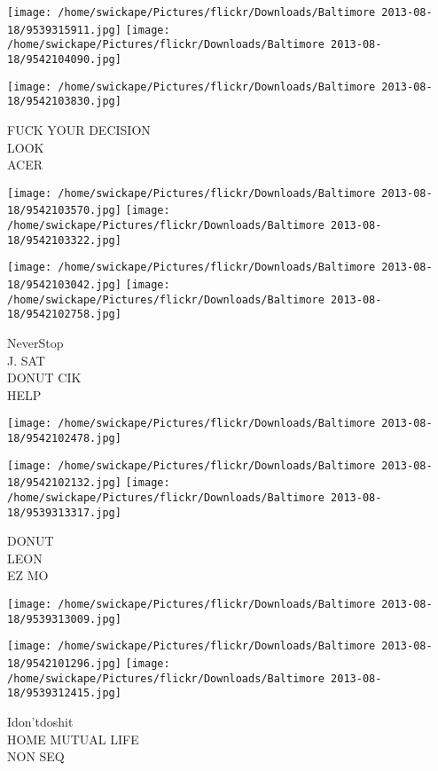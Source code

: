\documentclass[10pt,letterpaper]{article}
\begin{document}
\texttt{[image: /home/swickape/Pictures/flickr/Downloads/Baltimore 2013-08-18/9539315911.jpg]}
\texttt{[image: /home/swickape/Pictures/flickr/Downloads/Baltimore 2013-08-18/9542104090.jpg]}

\vspace{0.25in}
\texttt{[image: /home/swickape/Pictures/flickr/Downloads/Baltimore 2013-08-18/9542103830.jpg]}

FUCK YOUR DECISION\\
LOOK\\
ACER
\pagebreak

\texttt{[image: /home/swickape/Pictures/flickr/Downloads/Baltimore 2013-08-18/9542103570.jpg]}
\texttt{[image: /home/swickape/Pictures/flickr/Downloads/Baltimore 2013-08-18/9542103322.jpg]}

\texttt{[image: /home/swickape/Pictures/flickr/Downloads/Baltimore 2013-08-18/9542103042.jpg]}
\texttt{[image: /home/swickape/Pictures/flickr/Downloads/Baltimore 2013-08-18/9542102758.jpg]}

NeverStop\\
J. SAT\\
DONUT CIK\\
HELP
\pagebreak

\texttt{[image: /home/swickape/Pictures/flickr/Downloads/Baltimore 2013-08-18/9542102478.jpg]}

\vspace{0.25in}
\texttt{[image: /home/swickape/Pictures/flickr/Downloads/Baltimore 2013-08-18/9542102132.jpg]}
\texttt{[image: /home/swickape/Pictures/flickr/Downloads/Baltimore 2013-08-18/9539313317.jpg]}

DONUT\\
LEON\\
EZ MO
\pagebreak

\texttt{[image: /home/swickape/Pictures/flickr/Downloads/Baltimore 2013-08-18/9539313009.jpg]}

\vspace{0.25in}
\texttt{[image: /home/swickape/Pictures/flickr/Downloads/Baltimore 2013-08-18/9542101296.jpg]}
\texttt{[image: /home/swickape/Pictures/flickr/Downloads/Baltimore 2013-08-18/9539312415.jpg]}

Idon'tdoshit\\
HOME MUTUAL LIFE\\
NON SEQ
\pagebreak
\end{document}
